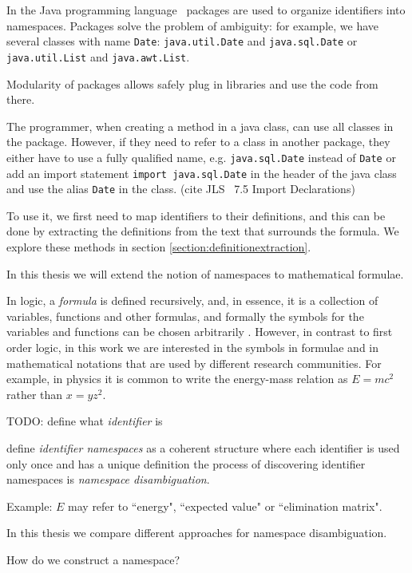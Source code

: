 In the Java programming language~\cite{gosling2014java} packages are used to organize identifiers
into namespaces.
Packages solve the problem of ambiguity: for example, we have several classes with
name \texttt{Date}: \texttt{java.util.Date} and  \texttt{java.sql.Date} or
\texttt{java.util.List} and \texttt{java.awt.List}.

Modularity of packages allows safely plug in libraries and use the code from there.


The programmer, when creating a method in a java class, can use all classes in the package.
However, if they need to refer to a class in another package, they either have
to use a fully qualified name, e.g. \texttt{java.sql.Date} instead of \texttt{Date}
or add an import statement \texttt{import java.sql.Date} in the header of the java
class and use the alias  \texttt{Date} in the class.  (cite JLS~\cite{gosling2014java} 7.5 Import Declarations)


To use it, we first need to map identifiers to their definitions, and this can be done by
extracting the definitions from the text that surrounds the formula. We explore these methods
in section \ref{section:definitionextraction}.




In this thesis we will extend the notion of namespaces to mathematical formulae.

In logic, a \emph{formula} is defined recursively, and, in essence,
it is a collection of variables, functions and other formulas, and formally the symbols for
the variables and functions can be chosen arbitrarily \cite{barwise2000language}.
However, in contrast to first order logic, in this work we are interested in the symbols
in formulae and in mathematical notations that are used by different research communities.
For example, in physics it is common to write the energy-mass relation as $E=mc^2$ rather
than $x=yz^2$.

TODO: define what \emph{identifier} is


define \emph{identifier namespaces} as a coherent structure where each identifier is used only once and has a unique definition
the process of discovering identifier namespaces is \emph{namespace disambiguation}.


Example:
$E$ may refer to ``energy", ``expected value" or ``elimination matrix".

In this thesis we compare different approaches for namespace disambiguation.

How do we construct a namespace?

